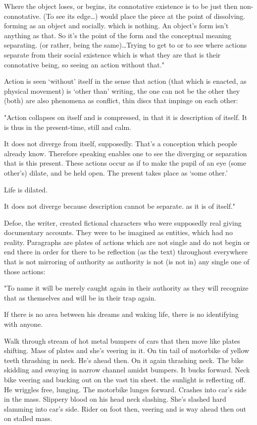 \documentclass[
]{memoir}
\begin{document}
Where the object loses, or begins, its connotative existence is to be
just then non-connotative. (To see its edge\ldots{}) would place the
piece at the point of dissolving. forming as an object and socially.
which is nothing. An object's form isn't anything as that. So it's the
point of the form and the conceptual meaning separating. (or rather,
being the same)\ldots{}Trying to get to or to see where actions separate
from their social existence which is what they are that is their
connotative being, so seeing an action without that."

Action is seen `without' itself in the sense that action (that which is
enacted, as physical movement) is `other than' writing, the one can not
be the other they (both) are also phenomena as conflict, thin discs that
impinge on each other:

"Action collapses on itself and is compressed, in that it is description
of itself. It is thus in the present-time, still and calm.

It does not diverge from itself, supposedly. That's a conception which
people already know. Therefore speaking enables one to see the diverging
or separation that is this present. These actions occur as if to make
the pupil of an eye (some other's) dilate, and be held open. The present
takes place as `some other.'

Life is dilated.

It does not diverge because description cannot be separate. as it is of
itself."

Defoe, the writer, created fictional characters who were supposedly real
giving documentary accounts. They were to be imagined as entities, which
had no reality. Paragraphs are plates of actions which are not single
and do not begin or end there in order for there to be reflection (as
the text) throughout everywhere that is not mirroring of authority as
authority is not (is not in) any single one of those actions:

"To name it will be merely caught again in their authority as they will
recognize that as themselves and will be in their trap again.

If there is no area between his dreams and waking life, there is no
identifying with anyone.

Walk through stream of hot metal bumpers of cars that then move like
plates shifting. Mass of plates and she's veering in it. On tin tail of
motorbike of yellow teeth thrashing in neck. He's ahead then. On it
again thrashing neck. The bike skidding and swaying in narrow channel
amidst bumpers. It bucks forward. Neck bike veering and bucking out on
the vast tin sheet. the sunlight is reflecting off. He wriggles free,
lunging. The motorbike lunges forward. Crashes into car's side in the
mass. Slippery blood on his head neck slashing. She's slashed hard
slamming into car's side. Rider on foot then, veering and is way ahead
then out on stalled mass.
\end{document}
